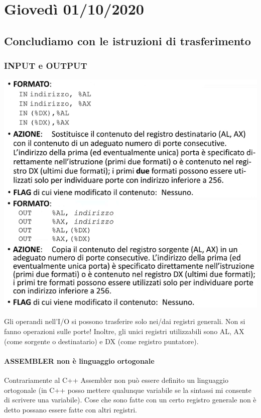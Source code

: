 \documentclass[11pt]{report}
\begin{document}
\chapter{Giovedì 01/10/2020}
\section{Concludiamo con le istruzioni di trasferimento}
\subsection{INPUT e OUTPUT}
\begin{center}
\includegraphics{img/12.PNG}
\includegraphics{img/13.PNG}
\end{center}
Gli operandi nell'I/O si possono trasferire solo nei/dai registri generali. Non si fanno operazioni sulle porte! Inoltre, gli unici registri utilizzabili sono AL, AX (come sorgente o destinatario) e DX (come registro puntatore). 
\subsubsection{ASSEMBLER non è linguaggio ortogonale}
Contrariamente al C++ Assembler non può essere definito un linguaggio ortogonale (in C++ posso mettere qualunque variabile se la sintassi mi consente di scrivere una variabile). Cose che sono fatte con un certo registro generale non è detto possano essere fatte con altri registri. 
\end{document}
